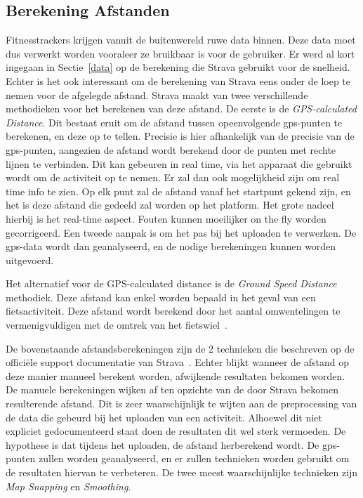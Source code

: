 \subsection{Berekening Afstanden}
Fitnesstrackers krijgen vanuit de buitenwereld ruwe data binnen. Deze data moet
dus verwerkt worden vooraleer ze bruikbaar is voor de gebruiker. Er werd al
kort ingegaan in Sectie~\ref{data} op de berekening die Strava gebruikt voor de
snelheid. Echter is het ook interessant om de berekening van Strava eens onder
de loep te nemen voor de afgelegde afstand. Strava maakt van twee verschillende
methodieken voor het berekenen van deze afstand. De eerste is de
\textit{GPS-calculated Distance}. Dit bestaat eruit om de afstand tussen
opeenvolgende gps-punten te berekenen, en deze op te tellen. Precisie is hier
afhankelijk van de precisie van de gps-punten, aangezien de afstand wordt
berekend door de punten met rechte lijnen te verbinden. Dit kan gebeuren in
real time, via het apparaat die gebruikt wordt om de activiteit op te nemen. Er
zal dan ook mogelijkheid zijn om real time info te zien. Op elk punt zal de
afstand vanaf het startpunt gekend zijn, en het is deze afstand die gedeeld zal
worden op het platform. Het grote nadeel hierbij is het real-time aspect.
Fouten kunnen moeilijker on the fly worden gecorrigeerd. Een tweede aanpak is
om het pas bij het uploaden te verwerken. De gps-data wordt dan geanalyseerd,
en de nodige berekeningen kunnen worden uitgevoerd.

Het alternatief voor de GPS-calculated distance is de \textit{Ground Speed
    Distance} methodiek. Deze afstand kan enkel worden bepaald in het geval van een
fietsactiviteit. Deze afstand wordt berekend door het aantal omwentelingen te
vermenigvuldigen met de omtrek van het fietswiel~\cite{HowDista47:online}.

De bovenstaande afstandsberekeningen zijn de 2 technieken die beschreven op de
officiële support documentatie van Strava~\cite{HowDista47:online}. Echter
blijkt wanneer de afstand op deze manier manueel berekent worden, afwijkende
resultaten bekomen worden. De manuele berekeningen wijken af ten opzichte van
de door Strava bekomen resulterende afstand. Dit is zeer waarschijnlijk te
wijten aan de preprocessing van de data die gebeurd bij het uploaden van een
activiteit. Alhoewel dit niet expliciet gedocumenteerd staat doen de resultaten
dit wel sterk vermoeden. De hypothese is dat tijdens het uploaden, de afstand
herberekend wordt. De gps-punten zullen worden geanalyseerd, en er zullen
technieken worden gebruikt om de resultaten hiervan te verbeteren. De twee
meest waarschijnlijke technieken zijn \textit{Map Snapping} en
\textit{Smoothing}.

